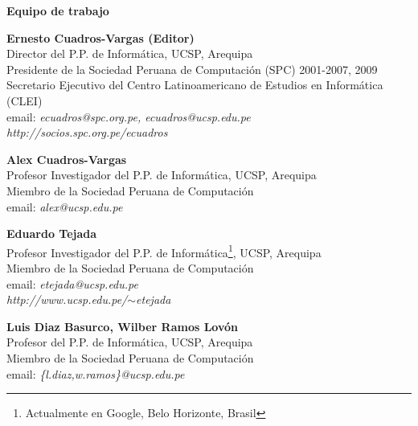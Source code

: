 \begin{center}
{\bf \Huge Equipo de trabajo}
\end{center}
\vspace{1cm}

\begin{center}
\textbf{Ernesto Cuadros-Vargas (Editor)}\\
Director del P.P. de Informática, UCSP, Arequipa\\ %
Presidente de la Sociedad Peruana de Computación (SPC) 2001-2007, 2009\\
Secretario Ejecutivo del Centro Latinoamericano de Estudios en Informática (CLEI)\\
email: \textit{ecuadros@spc.org.pe, ecuadros@ucsp.edu.pe}\\
\textit{http://socios.spc.org.pe/ecuadros}
\end{center}

\begin{center}
\textbf{Alex Cuadros-Vargas}\\
Profesor Investigador del P.P. de Informática, UCSP, Arequipa\\
Miembro de la Sociedad Peruana de Computación\\
email: \textit{alex@ucsp.edu.pe}\\
\end{center}

\begin{center}
\textbf{Eduardo Tejada}\\
Profesor Investigador del P.P. de Informática\footnote{Actualmente en Google, Belo Horizonte, Brasil}, UCSP, Arequipa\\
Miembro de la Sociedad Peruana de Computación\\
email: \textit{etejada@ucsp.edu.pe}\\
\textit{http://www.ucsp.edu.pe/$\sim$etejada}
\end{center}

\begin{center}
\textbf{Luis Diaz Basurco, Wilber Ramos Lovón}\\
Profesor del P.P. de Informática, UCSP, Arequipa\\
Miembro de la Sociedad Peruana de Computación\\
email: \textit{\{l.diaz,w.ramos\}@ucsp.edu.pe}
\end{center}

